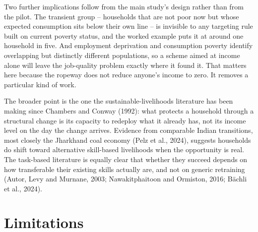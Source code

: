\documentclass[11pt]{article}
\begin{document}
Two further implications follow from the main study's design rather than from the pilot. The
transient group -- households that are not poor now but whose expected consumption sits below
their own line -- is invisible to any targeting rule built on current poverty status, and the
worked example puts it at around one household in five. And employment deprivation and
consumption poverty identify overlapping but distinctly different populations, so a scheme
aimed at income alone will leave the job-quality problem exactly where it found it. That
matters here because the ropeway does not reduce anyone's income to zero. It removes a
particular kind of work.

The broader point is the one the sustainable-livelihoods literature has been making since
Chambers and Conway (1992): what protects a household through a structural change is its
capacity to redeploy what it already has, not its income level on the day the change arrives.
Evidence from comparable Indian transitions, most closely the Jharkhand coal economy (Pelz et
al., 2024), suggests households do shift toward alternative skill-based livelihoods when the
opportunity is real. The task-based literature is equally clear that whether they succeed
depends on how transferable their existing skills actually are, and not on generic retraining
(Autor, Levy and Murnane, 2003; Nawakitphaitoon and Ormiston, 2016; Bächli et al., 2024).

\section{Limitations}
\end{document}
